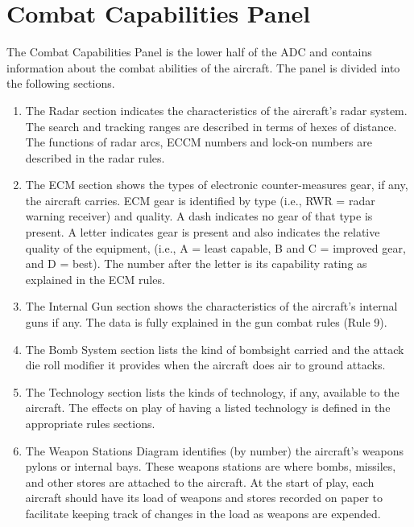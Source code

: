 \section{Combat Capabilities Panel}

The Combat Capabilities Panel is the lower half of the ADC and contains information about the combat abilities of the aircraft.  The panel is divided into the following sections.

\begin{enumerate}[resume]

    \item {} 
    The Radar section indicates the characteristics of the aircraft's radar system. The search and tracking ranges are described in terms of hexes of distance. The functions of radar arcs, ECCM numbers and lock-on numbers are described in the radar rules.

    \item {} 
    The ECM section shows the types of electronic counter-measures gear, if any, the aircraft carries. ECM gear is identified by type (i.e., RWR = radar warning receiver) and quality. A dash indicates no gear of that type is present. A letter indicates gear is present and also indicates the relative quality of the equipment, (i.e., A = least capable, B and C = improved gear, and D = best). The number after the letter is its capability rating as explained in the ECM rules.

    \item {} 
    The Internal Gun section shows the characteristics of the aircraft's internal guns if any. The data is fully explained in the gun combat rules (Rule 9).

    \item {} 
    The Bomb System section lists the kind of bombsight carried and the attack die roll modifier it provides when the aircraft does air to ground attacks.

    \item {}
    The Technology section lists the kinds of technology, if any, available to the aircraft. The effects on play of having a listed technology is defined in the appropriate rules sections.

    \item {} 
    The Weapon Stations Diagram identifies (by number) the aircraft's weapons pylons or internal bays. These weapons stations are where bombs, missiles, and other stores are attached to the aircraft. At the start of play, each aircraft should have its load of weapons and stores recorded on paper to facilitate keeping track of changes in the load as weapons are expended.


\end{enumerate}
